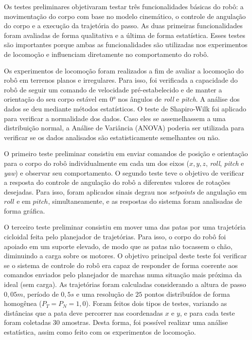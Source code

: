 \documentclass[conference]{IEEEtran}
\begin{document}
  Os testes preliminares objetivaram testar três funcionalidades básicas do robô: a movimentação do corpo com base no modelo cinemático, o controle de angulação do corpo e a execução da trajetória do passo. As duas primeiras funcionalidades foram avaliadas de forma qualitativa e a última de forma estatística. Esses testes são importantes porque ambas as funcionalidades são utilizadas nos experimentos de locomoção e influenciam diretamente no comportamento do robô. 

  Os experimentos de locomoção foram realizados a fim de avaliar a locomoção do robô em terrenos planos e irregulares. Para isso, foi verificada a capacidade do robô de seguir um comando de velocidade pré-estabelecido e de manter a orientação do seu corpo estável em $0°$ nos ângulos de \textit{roll} e \textit{pitch}. A análise dos dados se deu mediante métodos estatísticos. O teste de Shapiro-Wilk \cite{leotti2005comparaccao} foi aplicado para verificar a normalidade dos dados. Caso eles se assemelhassem a uma distribuição normal, a Análise de Variância (ANOVA) \cite{cano2012six} poderia ser utilizada para verificar se os dados analisados são estatisticamente semelhantes ou não.

  O primeiro teste preliminar consistiu em enviar comandos de posição e orientação para o corpo do robô individualmente em cada um dos eixos ($x, y, z$, \textit{roll}, \textit{pitch} e \textit{yaw}) e observar seu comportamento. O segundo teste teve o objetivo de verificar a resposta do controle de angulação do robô a diferentes valores de rotações desejadas. Para isso, foram aplicados sinais degrau nos \textit{setpoints} de angulação em $roll$ e em $pitch$, simultaneamente, e as respostas do sistema foram analisadas de forma gráfica.
  
  O terceiro teste preliminar consistiu em mover uma das patas por uma trajetória cicloidal feita pelo planejador de trajetórias. Para isso, o corpo do robô foi apoiado em um suporte elevado, de modo que as patas não tocassem o chão, diminuindo a carga sobre os motores. O objetivo principal deste teste foi verificar se o sistema de controle do robô era capaz de responder de forma coerente aos comandos enviados pelo planejador de marchas numa situação mais próxima da ideal (sem carga). As trajetórias foram calculadas considerando a altura de passo $0,05 m$, período de $0,5 s$ e uma resolução de $25$ pontos distribuídos de forma homogênea ($P_T = P_N = 1,0$). Foram feitos dois tipos de testes, variando as distâncias que a pata deve percorrer nas coordenadas $x$ e $y$, e para cada teste foram coletadas 30 amostras. Desta forma, foi possível realizar uma análise estatística, assim como feito com os experimentos de locomoção.
  
\end{document}
